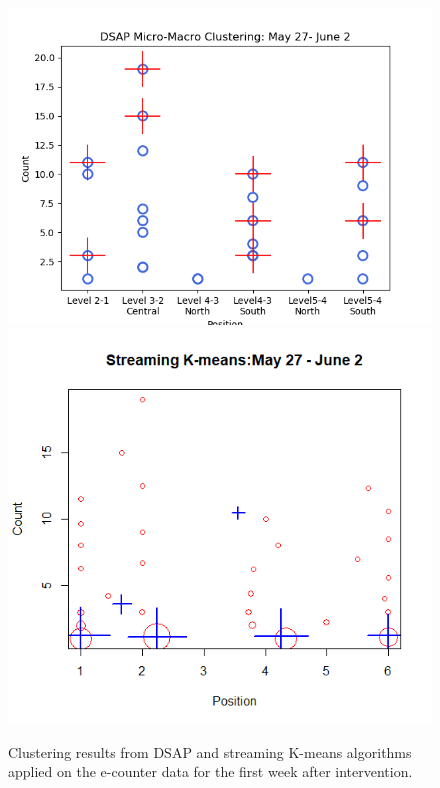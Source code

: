 \begin{figure}[]
    \centering
    \includegraphics[width=.49\textwidth]{image/Chapters/Chapter6/After5hour-samp 9.preference 4.No Thre.png}
    \includegraphics[width=.49\textwidth]{image/Chapters/Chapter6/StreamKAfter.png}
    \caption{Clustering results from DSAP and streaming K-means algorithms applied on the e-counter data for the first week after intervention.}
    \label{36}
\end{figure}





